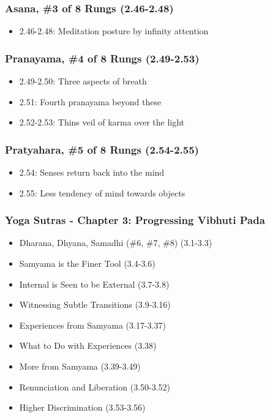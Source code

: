 \begin{frame}[fragile]\frametitle{Asana, \#3 of 8 Rungs (2.46-2.48)}
\begin{itemize}
\item 2.46-2.48: Meditation posture by infinity attention
\end{itemize}
\end{frame}

\begin{frame}[fragile]\frametitle{Pranayama, \#4 of 8 Rungs (2.49-2.53)} 
\begin{itemize}
\item 2.49-2.50: Three aspects of breath
\item 2.51: Fourth pranayama beyond these
\item 2.52-2.53: Thins veil of karma over the light
\end{itemize}
\end{frame}

\begin{frame}[fragile]\frametitle{Pratyahara, \#5 of 8 Rungs (2.54-2.55)}
\begin{itemize}
\item 2.54: Senses return back into the mind
\item 2.55: Less tendency of mind towards objects 
\end{itemize}
\end{frame}

\begin{frame}[fragile]\frametitle{Yoga Sutras - Chapter 3: Progressing Vibhuti Pada}
\begin{itemize}
\item Dharana, Dhyana, Samadhi (\#6, \#7, \#8) (3.1-3.3)
\item Samyama is the Finer Tool (3.4-3.6)
\item Internal is Seen to be External (3.7-3.8)
\item Witnessing Subtle Transitions (3.9-3.16)
\item Experiences from Samyama (3.17-3.37)
\item What to Do with Experiences (3.38)
\item More from Samyama (3.39-3.49)
\item Renunciation and Liberation (3.50-3.52)
\item Higher Discrimination (3.53-3.56)
\end{itemize}
\end{frame}

